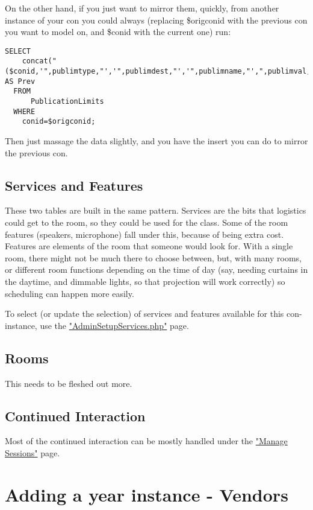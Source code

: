 \documentclass[captions=tablesignature]{scrartcl}
\begin{document}
On the other hand, if you just want to mirror them, quickly, from
another instance of your con you could always (replacing \$origconid
with the previous con you want to model on, and \$conid with the
current one) run:
\begin{verbatim}
SELECT
    concat("($conid,'",publimtype,"','",publimdest,"','",publimname,"',",publimval,",'",publimnote,"'),") AS Prev
  FROM
      PublicationLimits
  WHERE
    conid=$origconid;
\end{verbatim}
Then just massage the data slightly, and you have the insert you
can do to mirror the previous con.

\subsection{Services and Features}
\label{sec-13-2}

These two tables are built in the same pattern.  Services are the
bits that logistics could get to the room, so they could be used
for the class.  Some of the room features (speakers, microphone)
fall under this, because of being extra cost.  Features are
elements of the room that someone would look for.  With a single
room, there might not be much there to choose between, but, with
many rooms, or different room functions depending on the time of
day (say, needing curtains in the daytime, and dimmable lights, so
that projection will work correctly) so scheduling can happen more
easily.

To select (or update the selection) of services and features
available for this con-instance, use the \href{../webpages/AdminSetupServices.php}{"AdminSetupServices.php"}
page.
\subsection{Rooms}
\label{sec-13-3}

This needs to be fleshed out more.

\subsection{Continued Interaction}
\label{sec-13-4}

Most of the continued interaction can be mostly handled under the
\href{../webpages/StaffManageSessions.php}{"Manage Sessions"} page.

\section{Adding a year instance - Vendors}
\label{sec-14}
\end{document}

